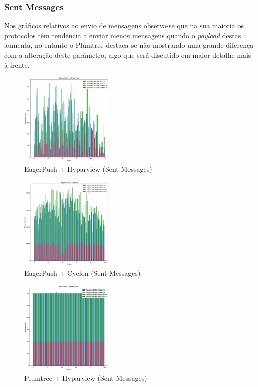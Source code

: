 
\subsubsection{Sent Messages}
Nos gráficos relativos ao envio de mensagens observa-se que na sua maioria os protocolos têm tendência a enviar menos mensagens quando o \textit{payload} destas aumenta, no entanto o Plumtree destaca-se não mostrando uma grande diferença com a alteração deste parâmetro, algo que será discutido em maior detalhe mais à frente.


\begin{figure}
  \includegraphics[width=0.4\textwidth]{images/EagerPush + HyparviewSent.png}
  \caption{EagerPush + Hyparview (Sent Messages)}
\end{figure}

\begin{figure}
  \includegraphics[width=0.4\textwidth]{images/EagerPush + CyclonSent.png}
  \caption{EagerPush + Cyclon (Sent Messages)}
\end{figure}

\begin{figure}
  \includegraphics[width=0.4\textwidth]{images/Plumtree + HyparviewSent.png}
  \caption{Plumtree + Hyparview (Sent Messages)}
\end{figure}

